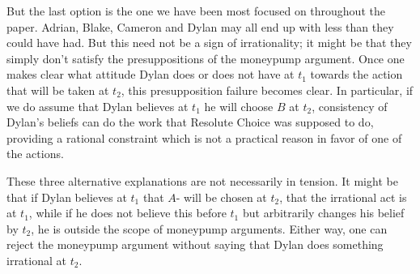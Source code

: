 \documentclass[
  11pt,
  letterpaper]{article}
\begin{document}
But the last option is the one we have been most focused on throughout the paper. Adrian, Blake, Cameron and Dylan may all end up with less than they could have had. But this need not be a sign of irrationality; it might be that they simply don't satisfy the presuppositions of the moneypump argument. Once one makes clear what attitude Dylan does or does not have at $t_1$ towards the action that will be taken at $t_2$, this presupposition failure becomes clear. In particular, if we do assume that Dylan believes at $t_1$ he will choose $B$ at $t_2$, consistency of Dylan's beliefs can do the work that Resolute Choice was supposed to do, providing a rational constraint which is not a practical reason in favor of one of the actions.

These three alternative explanations are not necessarily in tension. It might be that if Dylan believes at $t_1$ that $A$- will be chosen at $t_2$, that the irrational act is at $t_1$, while if he does not believe this before $t_1$ but arbitrarily changes his belief by $t_2$, he is outside the scope of moneypump arguments. Either way, one can reject the moneypump argument without saying that Dylan does something irrational at $t_2$.



\end{document}
